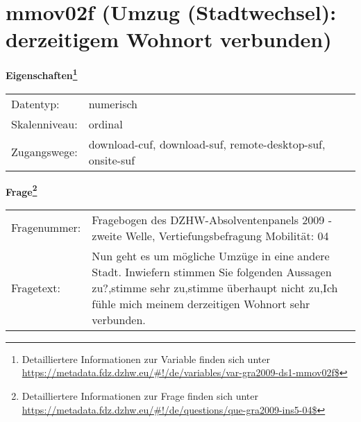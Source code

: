
    \setcounter{footnote}{0}

    \vspace*{-1.8cm}
	\section{mmov02f (Umzug (Stadtwechsel): derzeitigem Wohnort verbunden)}
	\label{section:mmov02f}



    \vspace*{0.5cm}
    \noindent\textbf{Eigenschaften\footnote{Detailliertere Informationen zur Variable finden sich unter
		\url{https://metadata.fdz.dzhw.eu/\#!/de/variables/var-gra2009-ds1-mmov02f$}}}\\
	\begin{tabularx}{\hsize}{@{}lX}
	Datentyp: & numerisch \\
	Skalenniveau: & ordinal \\
	Zugangswege: &
	  download-cuf, 
	  download-suf, 
	  remote-desktop-suf, 
	  onsite-suf
 \\
    \end{tabularx}



				\vspace*{0.5cm}
                \noindent\textbf{Frage\footnote{Detailliertere Informationen zur Frage finden sich unter
		              \url{https://metadata.fdz.dzhw.eu/\#!/de/questions/que-gra2009-ins5-04$}}}\\
				\begin{tabularx}{\hsize}{@{}lX}
					Fragenummer: &
					  Fragebogen des DZHW-Absolventenpanels 2009 - zweite Welle, Vertiefungsbefragung Mobilität:
					  04
 \\
					Fragetext: & Nun geht es um mögliche Umzüge in eine andere Stadt. Inwiefern stimmen Sie folgenden Aussagen zu?,stimme sehr zu,stimme überhaupt nicht zu,Ich fühle mich meinem derzeitigen Wohnort sehr verbunden. \\
				\end{tabularx}





